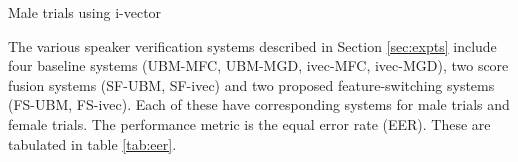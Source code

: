\documentclass{article}
\begin{document}
\begin{table}
\begin{subtable}{.55\linewidth}
\centering
{
\caption{\small Male trials using i-vector}
\label{tab:eer_ivec_male}}
\end{subtable}%
\begin{subtable}{.55\linewidth}
\centering
\caption{\small Female trials using i-vector}
{
\label{tab:eer_ivec_female}}
\end{subtable}
\label{tab:eer}
\end{table}


The various speaker verification systems described in Section \ref{sec:expts} 
include four baseline systems (UBM-MFC, UBM-MGD, ivec-MFC, ivec-MGD), two score 
fusion systems (SF-UBM, SF-ivec) and two proposed feature-switching systems 
(FS-UBM, FS-ivec). Each of these have corresponding systems for male trials and 
female trials. The performance metric is the equal error rate (EER). These are 
tabulated in table \ref{tab:eer}.
\end{document}
